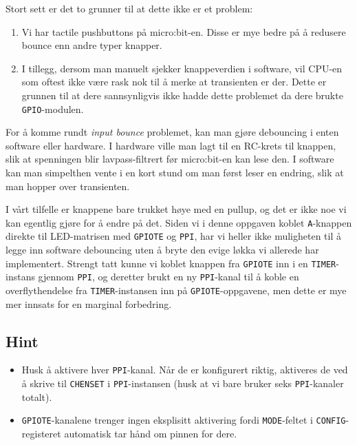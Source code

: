 Stort sett er det to grunner til at dette ikke er et problem:

\begin{enumerate}
    \item Vi har tactile pushbuttons på micro:bit-en. Disse er mye bedre på å redusere bounce enn andre typer knapper.
    \item I tillegg, dersom man manuelt sjekker knappeverdien i software, vil CPU-en som oftest ikke være rask nok til å merke at transienten er der. Dette er grunnen til at dere sannsynligvis ikke hadde dette problemet da dere brukte \verb|GPIO|-modulen.
\end{enumerate}

For å komme rundt \textit{input bounce} problemet, kan man gjøre debouncing i enten software eller hardware. I hardware ville man lagt til en RC-krets til knappen, slik at spenningen blir lavpass-filtrert før micro:bit-en kan lese den. I software kan man simpelthen vente i en kort stund om man først leser en endring, slik at man hopper over transienten.

I vårt tilfelle er knappene bare trukket høye med en pullup, og det er ikke noe vi kan egentlig gjøre for å endre på det. Siden vi i denne oppgaven koblet \verb|A|-knappen direkte til LED-matrisen med \verb|GPIOTE| og \verb|PPI|, har vi heller ikke muligheten til å legge inn software debouncing uten å bryte den evige løkka vi allerede har implementert. Strengt tatt kunne vi koblet knappen fra \verb|GPIOTE| inn i en \verb|TIMER|-instans gjennom \verb|PPI|, og deretter brukt en ny \verb|PPI|-kanal til å koble en overflythendelse fra \verb|TIMER|-instansen inn på \verb|GPIOTE|-oppgavene, men dette er mye mer innsats for en marginal forbedring.

\subsection{Hint}\label{subsec:PPI-hint}


\begin{itemize}
    \item Husk å aktivere hver \verb|PPI|-kanal. Når de er konfigurert riktig, aktiveres de ved å skrive til \verb|CHENSET| i \verb|PPI|-instansen (husk at vi bare bruker seks \verb|PPI|-kanaler totalt).
    \item \verb|GPIOTE|-kanalene trenger ingen eksplisitt aktivering fordi \verb|MODE|-feltet i \verb|CONFIG|-registeret automatisk tar hånd om pinnen for dere.
\end{itemize}



